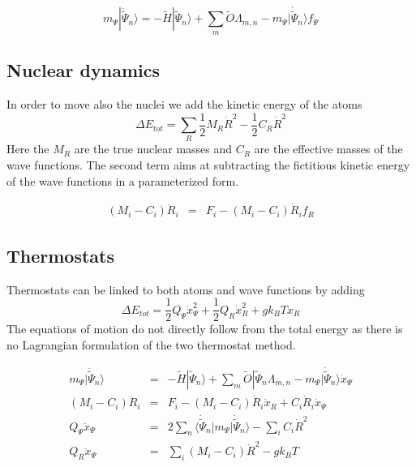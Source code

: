 \documentclass[final,12pt,makeidx,DIV=calc]{article}
\begin{document}
{{{\begin{equation}
m_\Psi|\ddot{\tilde\Psi}_n\rangle=-\tilde{H}|\tilde\Psi_n\rangle
+\sum_m\tilde{O}\Lambda_{m,n}
-m_\Psi|\dot{\tilde\Psi}_n\rangle f_\Psi
\end{equation}

\subsection{Nuclear dynamics}
In order to move also the nuclei we add the kinetic energy of the
atoms
\begin{equation}
\Delta E_{tot}=\sum_R \frac{1}{2}M_R\dot{R}^2-\frac{1}{2}C_R\dot{R}^2
\end{equation}
Here the $M_R$ are the true nuclear masses and $C_R$ are the effective
masses of the wave functions. The second term aims at subtracting the
fictitious kinetic energy of the wave functions in a parameterized form.

\begin{eqnarray*}
(M_i-C_i)\ddot{R}_i&=&F_i-(M_i-C_i)\dot{R}_i f_R
\end{eqnarray*}

\subsection{Thermostats}
Thermostats can be linked to both atoms and wave functions by adding
\begin{equation}
\Delta E_{tot}=\frac{1}{2}Q_\Psi\dot{x}_\Psi^2+\frac{1}{2}Q_R\dot{x}_R^2+gk_BT x_R
\end{equation}
The equations of motion do not directly follow from the total energy
as there is no Lagrangian formulation of the two thermostat method.

\begin{eqnarray*}
m_\Psi|\ddot{\tilde\Psi}_n\rangle&=&-\tilde{H}|\tilde\Psi_n\rangle+
\sum_m\tilde{O}|\tilde\Psi_n\Lambda_{m,n}
-m_\Psi|\dot{\tilde\Psi}_n\rangle \dot{x}_\Psi
\\
(M_i-C_i)\ddot{R}_i&=&F_i-(M_i-C_i)\dot{R}_i\dot{x}_R
+C_i\dot{R}_i\dot{x}_\Psi 
\\
Q_\Psi\ddot{x}_\Psi&=&2\sum_n
\langle\dot{\tilde\Psi}_n|m_\Psi|\dot{\tilde\Psi}_n\rangle 
-\sum_i C_i\dot{R}^2
\\
Q_R\ddot{x}_\Psi&=& \sum_i (M_i-C_i)\dot{R}^2-gk_BT
\end{eqnarray*}

}}}
\end{document}
